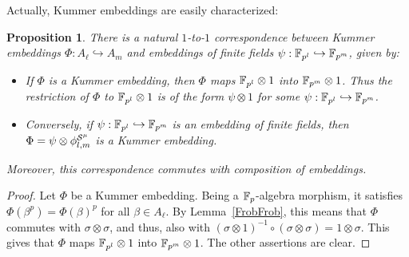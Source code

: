 \documentclass{sig-alternate}
\newtheorem{proposition}[theorem]{Proposition}
\begin{document}
Actually, Kummer embeddings are easily characterized:
\begin{proposition}
\label{Phipsi}
There is a natural $1$-to-$1$ correspondence between Kummer embeddings $\Phi:A_\ell\hookrightarrow A_m$
and embeddings of finite fields $\psi:\mathbb{F}_{p^l}\hookrightarrow\mathbb{F}_{p^m}$, given by:
\begin{itemize}
\item If $\Phi$ is a Kummer embedding, then $\Phi$ maps $\mathbb{F}_{p^l}\otimes1$ into $\mathbb{F}_{p^m}\otimes 1$.
Thus the restriction of $\Phi$ to $\mathbb{F}_{p^l}\otimes1$ is of the form $\psi\otimes1$ for some $\psi:\mathbb{F}_{p^l}\hookrightarrow\mathbb{F}_{p^m}$.
\item Conversely, if $\psi:\mathbb{F}_{p^l}\hookrightarrow\mathbb{F}_{p^m}$ is an embedding of finite fields, then $\Phi=\psi\otimes{\phi^{\mathcal{S}^\mu}_{{l},{m}}}$
is a Kummer embedding.
\end{itemize}
Moreover, this correspondence commutes with composition of embeddings.
\end{proposition}
\begin{proof}
Let $\Phi$ be a Kummer embedding. Being a $\mathbb{F}_{p}$-algebra morphism, it satisfies $\Phi(\beta^p)=\Phi(\beta)^p$ for all $\beta\in A_\ell$.
By Lemma~\ref{FrobFrob}, this means that $\Phi$ commutes with $\sigma\otimes\sigma$, and thus,
also with $(\sigma\otimes 1)^{-1}\circ(\sigma\otimes\sigma)=1\otimes\sigma$.
This gives that $\Phi$ maps $\mathbb{F}_{p^l}\otimes1$ into $\mathbb{F}_{p^m}\otimes 1$.
The other assertions are clear.
\end{proof}
\end{document}

